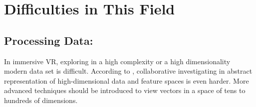 \documentclass[10pt,twocolumn,letterpaper]{article}
\begin{document}






\section{Difficulties in This Field}

\subsection{Processing Data:}In immersive VR, exploring in a high complexity or a high dimensionality modern data set is difficult. According to \cite{Donalek2014}, collaborative investigating in abstract representation of high-dimensional data and feature spaces is even harder. More advanced techniques should be introduced to view vectors in a space of tens to hundreds of dimensions.
\end{document}
